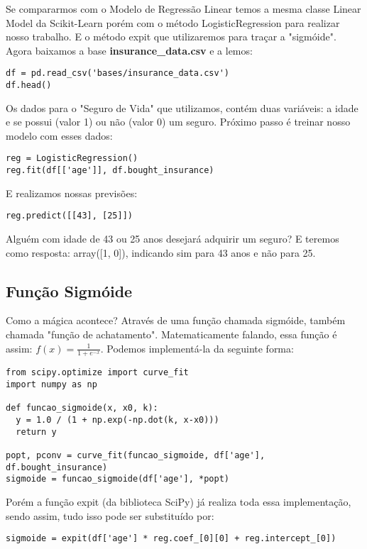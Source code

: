Se compararmos com o Modelo de Regressão Linear temos a mesma classe Linear Model da Scikit-Learn porém com o método LogisticRegression para realizar nosso trabalho. E o método expit que utilizaremos para traçar a "sigmóide". Agora baixamos a base \textbf{insurance\_data.csv} e a lemos:
\begin{lstlisting}[]
df = pd.read_csv('bases/insurance_data.csv')
df.head()
\end{lstlisting}

Os dados para o "Seguro de Vida" que utilizamos, contém duas variáveis: a idade e se possui (valor 1) ou não (valor 0) um seguro. Próximo passo é treinar nosso modelo com esses dados:
\begin{lstlisting}[]
reg = LogisticRegression()
reg.fit(df[['age']], df.bought_insurance)
\end{lstlisting}

E realizamos nossas previsões:
\begin{lstlisting}[]
reg.predict([[43], [25]])
\end{lstlisting}

Alguém com idade de 43 ou 25 anos desejará adquirir um seguro? E teremos como resposta: array([1, 0]), indicando sim para 43 anos e não para 25.

\subsection{Função Sigmóide}
Como a mágica acontece? Através de uma função chamada sigmóide, também chamada "função de achatamento". Matematicamente falando, essa função é assim: $f(x) = \frac{1}{1 + e^{-x}}$. Podemos implementá-la da seguinte forma:
\begin{lstlisting}[]
from scipy.optimize import curve_fit
import numpy as np

def funcao_sigmoide(x, x0, k):
  y = 1.0 / (1 + np.exp(-np.dot(k, x-x0)))
  return y

popt, pconv = curve_fit(funcao_sigmoide, df['age'], df.bought_insurance)
sigmoide = funcao_sigmoide(df['age'], *popt)
\end{lstlisting}

Porém a função expit (da biblioteca SciPy) já realiza toda essa implementação, sendo assim, tudo isso pode ser substituído por:
\begin{lstlisting}[]
sigmoide = expit(df['age'] * reg.coef_[0][0] + reg.intercept_[0])
\end{lstlisting}

